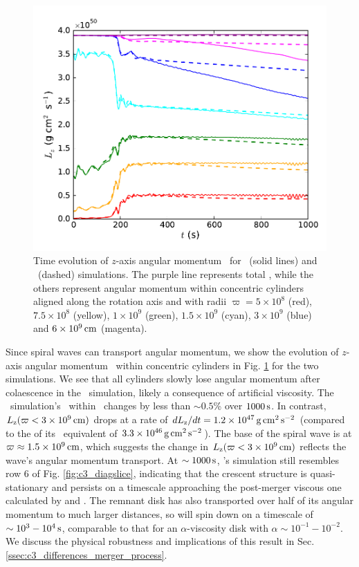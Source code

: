 \begin{figure}
\centering
\includegraphics[angle=0,width=0.6\columnwidth]{chapter3_zhu+u/figures/Lz.pdf}
\caption{Time evolution of $z$-axis angular momentum \Lz\ for \arepo\ (solid lines) and \gasoline\ (dashed) simulations.  The purple line represents total \Lz, while the others represent angular momentum within concentric cylinders aligned along the rotation axis and with radii $\varpi = 5\times10^8$ (red), $7.5\times10^8$ (yellow), $1\times10^9$ (green), $1.5\times10^9$ (cyan), $3\times10^9$ (blue) and $6\times10^9\,\mathrm{cm}$ (magenta).}
\label{fig:c3_angmo}
\end{figure}

Since spiral waves can transport angular momentum, we show the evolution of $z$-axis angular momentum \Lz\ within concentric cylinders in Fig. \ref{fig:c3_angmo} for the two simulations.  We see that all cylinders slowly lose angular momentum after colaescence in the \gasoline\ simulation, likely a consequence of artificial viscosity.  The \arepo\ simulation's \Lz\ within \innercyl\ changes by less than $\sim0.5$\% over $1000\,\mathrm{s}$.  In contrast, $\Lz(\varpi < 3\times10^9\,\mrm{cm})$ drops at a rate of $d\Lz/dt = 1.2\times10^{47}\,\mrm{g}\,\mrm{cm}^2\,\mrm{s}^{-2}$ (compared to the of its \gasoline\ equivalent of $3.3\times10^{46}\,\mathrm{g}\,\mathrm{cm}^2\,\mathrm{s}^{-2}$).  The base of the spiral wave is at $\varpi \approx 1.5\times10^9\,\mathrm{cm}$, which suggests the change in $\Lz(\varpi < 3\times10^9\,\mrm{cm})$ reflects the wave's angular momentum transport.  At $\sim1000\,\mathrm{s}$, \arepo's simulation still resembles row 6 of Fig. \ref{fig:c3_diagslice}, indicating that the crescent structure is quasi-stationary and persists on a timescale approaching the post-merger viscous one calculated by \citealt{vkercj10} and \cite{shen+12}.  The remnant disk has also transported over half of its angular momentum to much larger distances, so will spin down on a timescale of $\sim10^3-10^4\,\mathrm{s}$, comparable to that for an $\alpha$-viscosity disk with $\alpha \sim 10^{-1} - 10^{-2}$.  We discuss the physical robustness and implications of this result in Sec. \ref{ssec:c3_differences_merger_process}.

